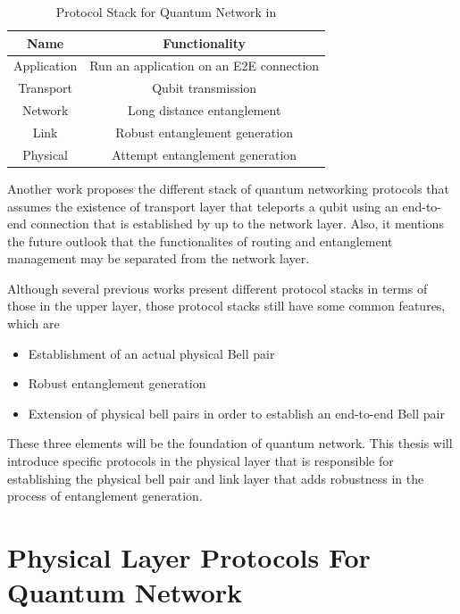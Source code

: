 \begin{table}[ht]
  \begin{center}
    \begin{tabular}{|c|c|} \hline
      Name & Functionality \\ \hline \cline{1-2}
      Application & Run an application on an E2E connection \\ \hline \cline{1-2}
      Transport & Qubit transmission \\ \hline \cline{1-2}
      Network & Long distance entanglement \\ \hline \cline{1-2}
      Link & Robust entanglement generation \\ \hline \cline{1-2}
      Physical & Attempt entanglement generation \\ \hline \cline{1-2}
    \end{tabular}
    \caption{Protocol Stack for Quantum Network in \cite{Dahlberg_2019}}
  \end{center}
\end{table}

Another work \cite{Dahlberg_2019} proposes the different stack of quantum networking protocols that assumes the existence of transport layer that teleports a qubit using an end-to-end connection that is established by up to the network layer.
Also, it mentions the future outlook that the functionalites of routing and entanglement management may be separated from the network layer.

Although several previous works present different protocol stacks in terms of those in the upper layer, those protocol stacks still have some common features, which are 
\begin{itemize}
  \item Establishment of an actual physical Bell pair
  \item Robust entanglement generation
  \item Extension of physical bell pairs in order to establish an end-to-end Bell pair
\end{itemize}

These three elements will be the foundation of quantum network. This thesis will introduce specific protocols in the physical layer that is responsible for establishing the physical bell pair and link layer that adds robustness in the process of entanglement generation.

\section{Physical Layer Protocols For Quantum Network}

